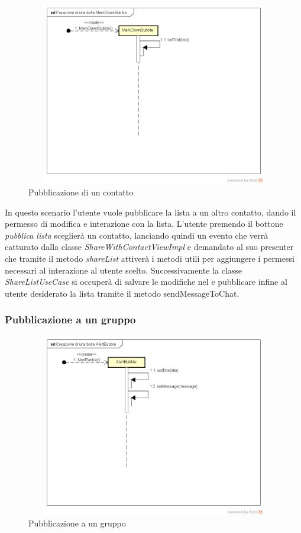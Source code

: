 \label{Pubblicazione di un contatto}
\begin{figure}[ht]
	\centering
	\includegraphics[width=12cm, height=8cm]{Sezioni/Diagrammi/img/Creazione di una bolla MarkDownBubble.png}
	\caption{Pubblicazione di un contatto}
	
\end{figure}
In questo scenario l'utente vuole pubblicare la lista a un altro contatto, dando il permesso di modifica e interazione con la lista. L'utente premendo il bottone \textit{pubblica lista} sceglierà un contatto, lanciando quindi un evento che verrà catturato dalla classe \textit{ShareWithContactViewImpl} e demandato al suo presenter che tramite il metodo \textit{shareList} attiverà i metodi utili per aggiungere i permessi necessari al interazione al utente scelto. Successivamente la classe \textit{ShareListUseCase} si occuperà di salvare le modifiche nel  e pubblicare infine al utente desiderato la lista tramite il metodo {sendMessageToChat}.


\subsubsection{Pubblicazione a un gruppo}

\label{Pubblicazione a un gruppo}
\begin{figure}[ht]
	\centering
	\includegraphics[width=12cm, height=8cm]{Sezioni/Diagrammi/img/Creazione di una bolla AlertBubble.png}
	\caption{Pubblicazione a un gruppo}
	
\end{figure}

